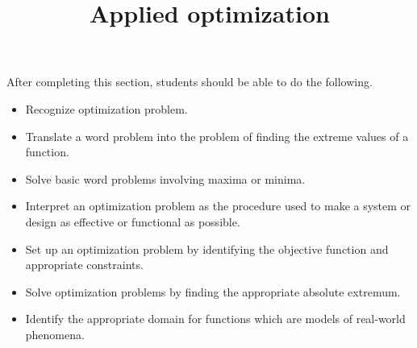 \documentclass{ximera}
\title{Applied optimization}
\begin{document}
\begin{abstract}
\end{abstract}

\maketitle

\begin{sectionOutcomes}

After completing this section, students should be able to do the following.

\begin{itemize}
\item Recognize optimization problem.
\item Translate a word problem into the problem of finding the extreme values of a function.
\item Solve basic word problems involving maxima or minima.
\item Interpret an optimization problem as the procedure used to make a system or design as effective or functional as possible.
\item Set up an optimization problem by identifying the objective function and appropriate constraints.
\item Solve optimization problems by finding the appropriate absolute extremum.
\item Identify the appropriate domain for functions which are models of real-world phenomena.   
\end{itemize}

\end{sectionOutcomes}
\end{document}
